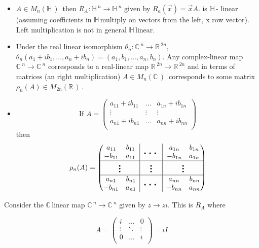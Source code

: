 \documentclass[12pt,a4paper]{article}
\newcommand{\rR}{\ensuremath{\mathbb{R}\,}}
\newcommand{\cC}{\ensuremath{\mathbb{C}\,}}
\newcommand{\hH}{\ensuremath{\mathbb{H}\,}}
\newcommand{\mnc}{\ensuremath{M_n(\cC)\,}}
\newcommand{\mnh}{\ensuremath{M_n(\hH)\,}}
\newcommand{\mr}[1]{\ensuremath{M_{#1}(\rR)\,}}
\newcommand{\rvline}{\hspace*{-\arraycolsep}\vline\hspace*{-\arraycolsep}}
\newcommand{\bigld}{\mbox{\normalfont\Large\bfseries \ldots}}
\newcommand{\bigvd}{\mbox{\normalfont\Large\bfseries \vdots}}
\begin{document}
\begin{itemize}
\item $A\in \mnh$ then $R_A:\hH^n\to\hH^n$ given by $R_a(\vec{x})=\vec{x}A.$  is \hH - linear (assuming coefficients in \hH multiply on vectors from the left, x row vector). Left multiplication is not in general \hH linear.
\item Under the real linear isomorphism $\theta_n: \cC^n \to \rR^{2n},$ $\theta _n (a_1+ib_1, \ldots , a_n+ib_n )=(a_1,b_1,\ldots, a_n,b_n)$. Any complex-linear map $\cC^n\to \cC^n$ corresponds to a real-linear map $\rR^{2n}\to \rR^{2n}$ and in terms of matrices (an right multiplication) $A\in \mnc$ corresponds to some matrix $\rho_n(A)\in \mr{2n}$.
\item \[\text{If } A=\begin{pmatrix}
  a_{11}+ib_{11} & \ldots &   a_{1n}+ib_{1n}\\
  \vdots & \vdots & \vdots \\
   a_{n1}+ib_{n1} & \ldots &   a_{nn}+ib_{nn}\\
\end{pmatrix}\]
then 
\[
\rho_n(A)=\begin{pmatrix}
  \begin{matrix}
  a_{11} & b_{11}  \\
  -b_{11} &   a_{11}
  \end{matrix}
  & \rvline & \bigld  & \rvline &
  \begin{matrix}
  a_{1n} & b_{1n}  \\
  -b_{1n} &   a_{1n}
  \end{matrix}  
  \\
\hline

  \bigvd
  & \rvline & \bigvd  & \rvline &
  \bigvd
  \\
\hline
    \begin{matrix}
  a_{n1} & b_{n1}  \\
  -b_{n1} &   a_{n1}
  \end{matrix}
  & \rvline & \bigld  & \rvline &
  \begin{matrix}
  a_{nn} & b_{nn}  \\
  -b_{nn} &   a_{nn}
  \end{matrix}  
\end{pmatrix}
\]
\end{itemize}

Consider the \cC linear map $\cC^n\to \cC^n$ given by $z\to zi$. This is $R_A$ where 

\[A= \begin{pmatrix}
  i & \ldots &   0\\
  \vdots & \ddots & \vdots \\
   0 & \ldots &   i\\
\end{pmatrix} =iI\]
\end{document}
